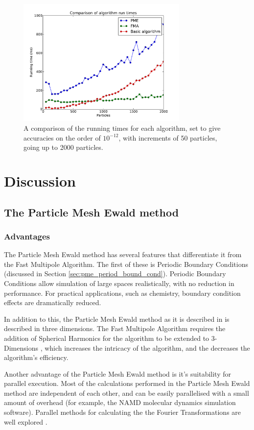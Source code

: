 \documentclass[pdftex,twoside,a4paper]{report}
\newcommand{\bcen}{\begin{center}}
\newcommand{\ecen}{\end{center}}
\newcommand{\pmem}{Particle Mesh Ewald method}
\newcommand{\fma}{Fast Multipole Algorithm}
\begin{document}
\begin{figure}[H]
\bcen \includegraphics[width=0.75\textwidth]{figures/graphs/comp_graph_low.pdf} \ecen
\caption{A comparison of the running times for each algorithm, set to give accuracies on the order of $10^{-12}$, with increments of 50 particles, going up to 2000 particles.}
\label{fig:comp_graph_low}
\end{figure}
\section{Discussion}
\subsection{The \pmem{}}
\subsubsection{Advantages}
The \pmem{} has several features that differentiate it from the \fma{}. The first of these is Periodic Boundary Conditions (discussed in Section \ref{sec:pme_period_bound_cond}). Periodic Boundary Conditions allow simulation of large spaces realistically, with no reduction in performance. For practical applications, such as chemistry, boundary condition effects are dramatically reduced.

In addition to this, the \pmem{} as it is described in \cite{darden:10089} is described in three dimensions. The \fma{} requires the addition of Spherical Harmonics for the algorithm to be extended to 3-Dimensions \cite{spherical}, which increases the intricacy of the algorithm, and the decreases the algorithm's efficiency.

Another advantage of the \pmem{} is it's suitability for parallel execution. Most of the calculations performed in the \pmem{} are independent of each other, and can be easily parallelised with a small amount of overhead (for example, the NAMD \cite{NAMD} molecular dynamics simulation software). Parallel methods for calculating the the Fourier Transformations are well explored \cite{lee05}.
\end{document}

